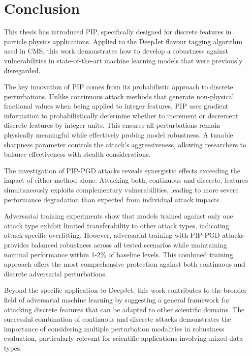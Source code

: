 \chapter{Conclusion}

This thesis has introduced PIP, specifically designed for discrete features in particle physics applications. Applied to the DeepJet flavour tagging algorithm used in CMS, this work demonstrates how to develop a robustness against vulnerabilities in state-of-the-art machine learning models that were previously disregarded.

The key innovation of PIP comes from its probabilistic approach to discrete perturbations. Unlike continuous attack methods that generate non-physical fractional values when being applied to integer features, PIP uses gradient information to probabilistically determine whether to increment or decrement discrete features by integer units. This ensures all perturbations remain physically meaningful while effectively probing model robustness. A tunable sharpness parameter controls the attack's aggressiveness, allowing researchers to balance effectiveness with stealth considerations.

The investigation of PIP-PGD attacks reveals synergistic effects exceeding the impact of either method alone. Attacking both, continuous and discrete, features simultaneously exploits complementary vulnerabilities, leading to more severe performance degradation than expected from individual attack impacts.

Adversarial training experiments show that models trained against only one attack type exhibit limited transferability to other attack types, indicating attack-specific overfitting. However, adversarial training with PIP-PGD attacks provides balanced robustness across all tested scenarios while maintaining nominal performance within 1-2\% of baseline levels. This combined training approach offers the most comprehensive protection against both continuous and discrete adversarial perturbations.

Beyond the specific application to DeepJet, this work contributes to the broader field of adversarial machine learning by suggesting a general framework for attacking discrete features that can be adapted to other scientific domains. The successful combination of continuous and discrete attacks demonstrates the importance of considering multiple perturbation modalities in robustness evaluation, particularly relevant for scientific applications involving mixed data types.

